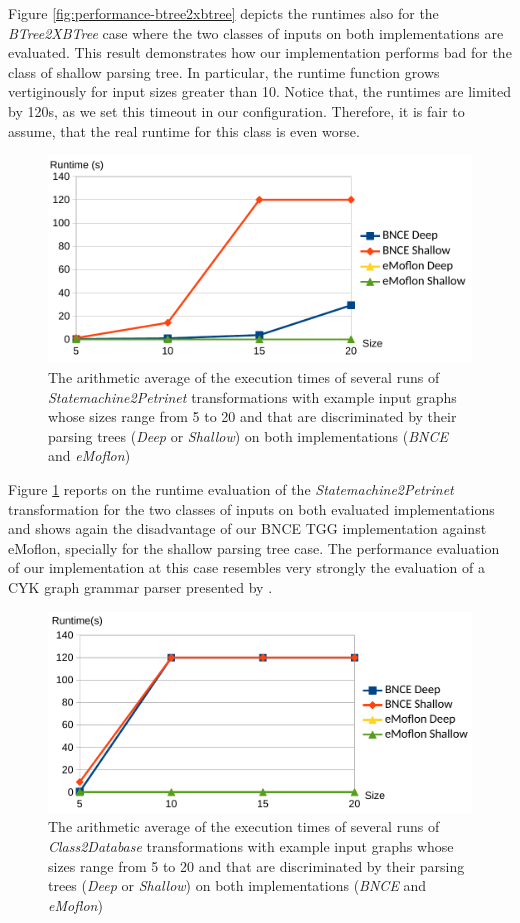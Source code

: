 Figure \ref{fig:performance-btree2xbtree} depicts the runtimes also for the \emph{BTree2XBTree} case where the two classes of inputs on both implementations are evaluated. This result demonstrates how our implementation performs bad for the class of shallow parsing tree. In particular, the runtime function grows vertiginously for input sizes greater than 10. Notice that, the runtimes are limited by 120s, as we set this timeout in our configuration. Therefore, it is fair to assume, that the real runtime for this class is even worse.

\begin{figure}
	\centering
	\includegraphics[width=.6\textwidth]{figures/performance/statemachine2petrinet}
	\caption{The arithmetic average of the execution times of several runs of \emph{Statemachine2Petrinet} transformations with example input graphs whose sizes range from 5 to 20 and that are discriminated by their parsing trees (\emph{Deep} or \emph{Shallow}) on both implementations (\emph{BNCE} and \emph{eMoflon})}
	\label{fig:performance-statemachine2petrinet}
\end{figure}

Figure \ref{fig:performance-statemachine2petrinet} reports on the runtime evaluation of the \emph{Statemachine2Petrinet} transformation for the two classes of inputs on both evaluated implementations and shows again the disadvantage of our BNCE TGG implementation against eMoflon, specially for the shallow parsing tree case. The performance evaluation of our implementation at this case resembles very strongly the evaluation of a CYK graph grammar parser presented by \citep[p. 83-90]{hoffmann2017generating}.

\begin{figure}
	\centering
	\includegraphics[width=.6\textwidth]{figures/performance/class2database}
	\caption{The arithmetic average of the execution times of several runs of \emph{Class2Database} transformations with example input graphs whose sizes range from 5 to 20 and that are discriminated by their parsing trees (\emph{Deep} or \emph{Shallow}) on both implementations (\emph{BNCE} and \emph{eMoflon})}
	\label{fig:performance-class2database}
\end{figure}

